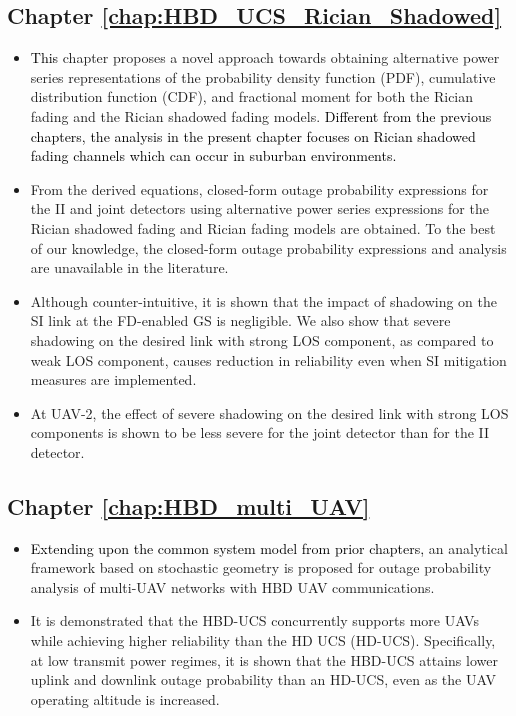 \subsection{Chapter \ref{chap:HBD_UCS_Rician_Shadowed}}
\begin{itemize}
\item \textcolor{black}{This} chapter proposes a novel approach towards obtaining alternative power series representations of the probability density function (PDF), cumulative distribution function (CDF), and fractional moment for both the Rician fading and the Rician shadowed fading models. \textcolor{black}{Different from the previous chapters, the analysis in the present chapter focuses on Rician shadowed fading channels which can occur in suburban environments.}
\item From the derived equations, closed-form outage probability expressions for the II and joint detectors using alternative power series expressions for the Rician shadowed fading and Rician fading models are obtained. To the best of our knowledge, the closed-form outage probability expressions and analysis are unavailable in the literature.
\item Although counter-intuitive, it is shown that the impact of shadowing on the SI link at the FD-enabled GS is negligible. We also show that severe shadowing on the desired link with strong LOS component, as compared to weak LOS component, causes reduction in reliability even when SI mitigation measures are implemented.
\item At UAV-2, the effect of severe shadowing on the desired link with strong LOS components is shown to be less severe for the joint detector than for the II detector.
\end{itemize}

\subsection{Chapter \ref{chap:HBD_multi_UAV}}
\begin{itemize}
\item \textcolor{black}{Extending upon the common system model from prior chapters,} an analytical framework based on stochastic geometry is proposed for outage probability analysis of multi-UAV networks with HBD UAV communications. 
\item It is demonstrated that the HBD-UCS concurrently supports more UAVs while achieving higher reliability than the HD UCS (HD-UCS). Specifically, at low transmit power regimes, it is shown that the HBD-UCS attains lower uplink and downlink outage probability than an HD-UCS, even as the UAV operating altitude is increased.
\end{itemize}

